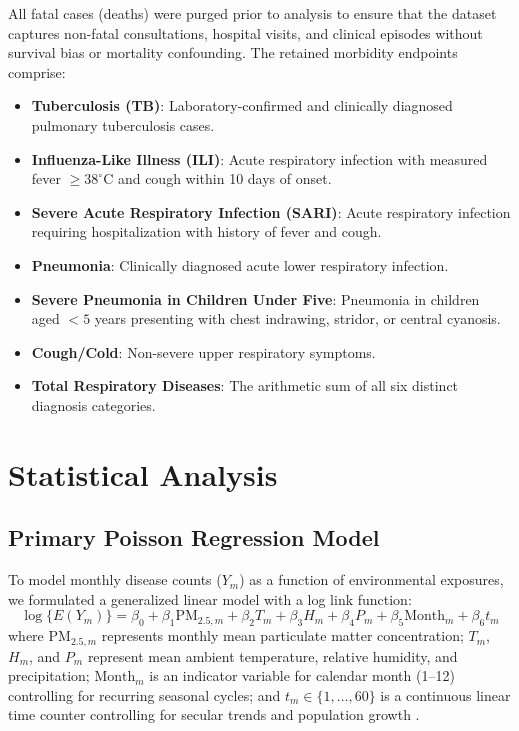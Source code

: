 \documentclass[12pt,a4paper]{report}
\begin{document}
All fatal cases (deaths) were purged prior to analysis to ensure that the dataset captures non-fatal consultations, hospital visits, and clinical episodes without survival bias or mortality confounding. The retained morbidity endpoints comprise:
\begin{itemize}
    \item \textbf{Tuberculosis (TB)}: Laboratory-confirmed and clinically diagnosed pulmonary tuberculosis cases.
    \item \textbf{Influenza-Like Illness (ILI)}: Acute respiratory infection with measured fever $\ge 38^\circ$C and cough within 10 days of onset.
    \item \textbf{Severe Acute Respiratory Infection (SARI)}: Acute respiratory infection requiring hospitalization with history of fever and cough.
    \item \textbf{Pneumonia}: Clinically diagnosed acute lower respiratory infection.
    \item \textbf{Severe Pneumonia in Children Under Five}: Pneumonia in children aged $<5$ years presenting with chest indrawing, stridor, or central cyanosis.
    \item \textbf{Cough/Cold}: Non-severe upper respiratory symptoms.
    \item \textbf{Total Respiratory Diseases}: The arithmetic sum of all six distinct diagnosis categories.
\end{itemize}

\section{Statistical Analysis}
\subsection{Primary Poisson Regression Model}
To model monthly disease counts ($Y_m$) as a function of environmental exposures, we formulated a generalized linear model with a log link function:
\begin{equation}
\log\{E(Y_m)\} = \beta_0 + \beta_1 \mathrm{PM}_{2.5,m} + \beta_2 T_m + \beta_3 H_m + \beta_4 P_m + \beta_5 \mathrm{Month}_m + \beta_6 t_m
\end{equation}
where $\mathrm{PM}_{2.5,m}$ represents monthly mean particulate matter concentration; $T_m$, $H_m$, and $P_m$ represent mean ambient temperature, relative humidity, and precipitation; $\mathrm{Month}_m$ is an indicator variable for calendar month (1--12) controlling for recurring seasonal cycles; and $t_m \in \{1, \dots, 60\}$ is a continuous linear time counter controlling for secular trends and population growth \parencite{CameronTrivedi2013}.
\end{document}
